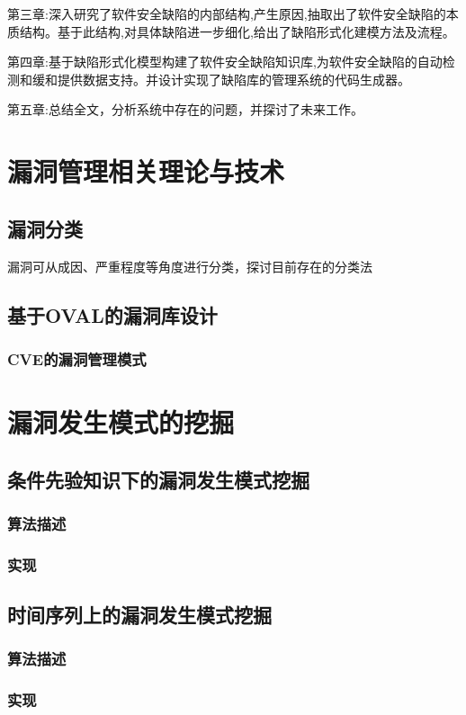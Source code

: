 \documentclass[a4paper]{ctexrep}
\begin{document}
		第三章:深入研究了软件安全缺陷的内部结构,产生原因,抽取出了软件安全缺陷的本质结构。基于此结构,对具体缺陷进一步细化,给出了缺陷形式化建模方法及流程。
		
		第四章:基于缺陷形式化模型构建了软件安全缺陷知识库,为软件安全缺陷的自动检测和缓和提供数据支持。并设计实现了缺陷库的管理系统的代码生成器。
		
		第五章:总结全文，分析系统中存在的问题，并探讨了未来工作。
	\chapter{漏洞管理相关理论与技术}
		\section{漏洞分类}
		漏洞可从成因、严重程度等角度进行分类，探讨目前存在的分类法
		\section{基于OVAL的漏洞库设计}
			\subsection{CVE的漏洞管理模式}
	\chapter{漏洞发生模式的挖掘}
		\section{条件先验知识下的漏洞发生模式挖掘}
			\subsection{算法描述}
			\subsection{实现}
		\section{时间序列上的漏洞发生模式挖掘}
			\subsection{算法描述}
			\subsection{实现}
\end{document}
